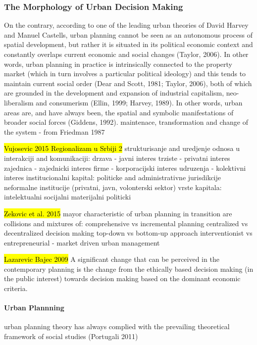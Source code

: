 \documentclass[11pt]{report}
\begin{document}
\subsubsection{The Morphology of Urban Decision Making}
On the contrary, according to one of the leading urban theories of David Harvey and Manuel Castells, urban planning cannot be seen as an autonomous process of spatial development, but rather it is situated in its political economic context and constantly overlaps current economic and social changes  (Taylor, 2006). In other words, urban planning in practice is intrinsically connected to the property market (which in turn involves a particular political ideology) and this tends to maintain current social order (Dear and Scott, 1981; Taylor, 2006), both of which are grounded in the development and expansion of industrial capitalism, neo-liberalism and consumerism (Ellin, 1999; Harvey, 1989). In other words, urban areas are, and have always been, the spatial and symbolic manifestations of broader social forces (Giddens, 1992).
maintenace, transformation and change of the system - from Friedman 1987

\hl{Vujosevic 2015 Regionalizam u Srbiji 2}
strukturisanje and uredjenje odnosa u interakciji and komunikaciji:
    drzava - javni interes
    trziste - privatni interes
    zajednica - zajednicki interes
    firme - korporacijski interes
    udruzenja - kolektivni interes
institucionalni kapital:
    politicke and administrativne jurisdikcije
    neformalne institucije (privatni, javn, volonterski sektor)
vrste kapitala:
    intelektualni
    socijalni
    materijalni
    politicki
    
\hl{Zekovic et al. 2015}
mayor characteristic of urban planning in transition are collisions and mixtures of:
    comprehensive vs incremental planning
    centralized vs decentralized decision making
    top-down vs bottom-up approach
    interventionist vs entrepreneurial - market driven urban management
    
\hl{Lazarevic Bajec 2009}
A significant change that can be perceived in the contemporary planning is the change from the ethically based decision making (in the public interest) towards decision making based on the dominant economic criteria.

\paragraph{Urban Plannning}
urban planning theory has always complied with the prevailing theoretical framework of social studies (Portugali 2011)
\end{document}
